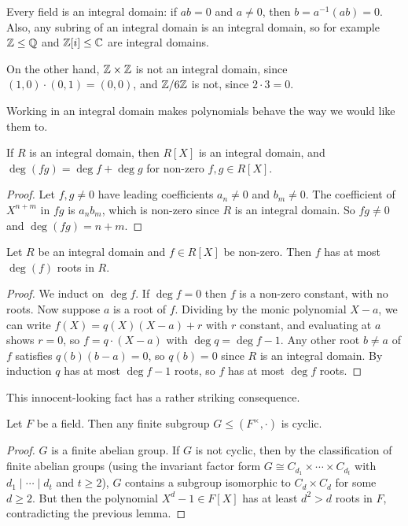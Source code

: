 \documentclass[a4paper]{scrartcl}
\begin{document}
\begin{example}
	Every field is an integral domain: if $ab = 0$ and $a \neq 0$, then $b = a^{-1}(ab) = 0$. Also, any subring of an integral domain is an integral domain, so for example $\mathbb{Z} \leq \mathbb{Q}$ and $\mathbb{Z}[i] \leq \mathbb{C}$ are integral domains.

	On the other hand, $\mathbb{Z} \times \mathbb{Z}$ is not an integral domain, since $(1, 0)\cdot(0, 1) = (0,0)$, and $\mathbb{Z}/6\mathbb{Z}$ is not, since $2 \cdot 3 = 0$.
\end{example}

Working in an integral domain makes polynomials behave the way we would like them to.

\begin{lemma}
	If $R$ is an integral domain, then $R[X]$ is an integral domain, and $\deg(fg) = \deg f + \deg g$ for non-zero $f, g \in R[X]$.
\end{lemma}
\begin{proof}
	Let $f, g \neq 0$ have leading coefficients $a_n \neq 0$ and $b_m \neq 0$. The coefficient of $X^{n + m}$ in $fg$ is $a_n b_m$, which is non-zero since $R$ is an integral domain. So $fg \neq 0$ and $\deg(fg) = n + m$.
\end{proof}

\begin{lemma}
	Let $R$ be an integral domain and $f \in R[X]$ be non-zero. Then $f$ has at most $\deg (f)$ roots in $R$.
\end{lemma}
\begin{proof}
	We induct on $\deg f$. If $\deg f = 0$ then $f$ is a non-zero constant, with no roots. Now suppose $a$ is a root of $f$. Dividing by the monic polynomial $X - a$, we can write $f(X) = q(X)(X - a) + r$ with $r$ constant, and evaluating at $a$ shows $r = 0$, so $f = q \cdot (X - a)$ with $\deg q = \deg f - 1$. Any other root $b \neq a$ of $f$ satisfies $q(b)(b - a) = 0$, so $q(b) = 0$ since $R$ is an integral domain. By induction $q$ has at most $\deg f - 1$ roots, so $f$ has at most $\deg f$ roots.
\end{proof}

This innocent-looking fact has a rather striking consequence.

\begin{theorem}
	Let $F$ be a field. Then any finite subgroup $G \leq (F^{\times}, \cdot)$ is cyclic.
\end{theorem}
\begin{proof}
	$G$ is a finite abelian group. If $G$ is not cyclic, then by the classification of finite abelian groups (using the invariant factor form $G \cong C_{d_1} \times \cdots \times C_{d_t}$ with $d_1 \mid \cdots \mid d_t$ and $t \geq 2$), $G$ contains a subgroup isomorphic to $C_d \times C_d$ for some $d \geq 2$. But then the polynomial $X^d - 1 \in F[X]$ has at least $d^2 > d$ roots in $F$, contradicting the previous lemma.
\end{proof}
\end{document}
